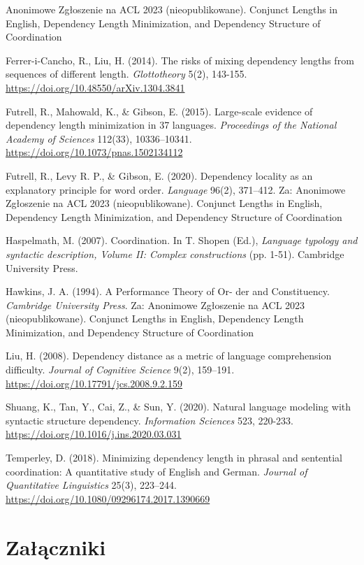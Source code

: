 \documentclass[licencjacka]{pracamgr_Kogni}
\begin{document}
\begin{thebibliography}{99}

Anonimowe Zgłoszenie na ACL 2023 (nieopublikowane). Conjunct Lengths in English, Dependency Length Minimization, and Dependency Structure of Coordination

Ferrer-i-Cancho, R., Liu, H. (2014). The risks of mixing dependency lengths from sequences of different length. \textit{Glottotheory} 5(2), 143-155. \url{https://doi.org/10.48550/arXiv.1304.3841}

Futrell, R., Mahowald, K., \& Gibson, E. (2015). Large-scale evidence of dependency length minimization in 37 languages. \textit{Proceedings of the National Academy of Sciences} 112(33), 10336–10341. \url{https://doi.org/10.1073/pnas.1502134112}

Futrell, R., Levy R. P., \& Gibson, E. (2020). Dependency locality as an explanatory principle for word order. \textit{Language} 96(2), 371–412. Za: Anonimowe Zgłoszenie na ACL 2023 (nieopublikowane). Conjunct Lengths in English, Dependency Length Minimization, and Dependency Structure of Coordination

Haspelmath, M. (2007). Coordination. In T. Shopen (Ed.), \textit{Language typology and syntactic description, Volume II: Complex constructions} (pp. 1-51). Cambridge University Press.

Hawkins, J. A. (1994). A Performance Theory of Or- der and Constituency. \textit{Cambridge University Press}. Za: Anonimowe Zgłoszenie na ACL 2023 (nieopublikowane). Conjunct Lengths in English, Dependency Length Minimization, and Dependency Structure of Coordination

Liu, H. (2008). Dependency distance as a metric of language comprehension difficulty. \textit{Journal of Cognitive Science} 9(2), 159–191. \url{https://doi.org/10.17791/jcs.2008.9.2.159}

Shuang, K., Tan, Y., Cai, Z., \& Sun, Y. (2020). Natural language modeling with syntactic structure dependency. \textit{Information Sciences} 523, 220-233. \url{https://doi.org/10.1016/j.ins.2020.03.031}

Temperley, D. (2018). Minimizing dependency length in phrasal and sentential coordination: A quantitative study of English and German. \textit{Journal of Quantitative Linguistics} 25(3), 223–244. \url{https://doi.org/10.1080/09296174.2017.1390669}

\end{thebibliography}


\chapter*{Załączniki}
\end{document}
